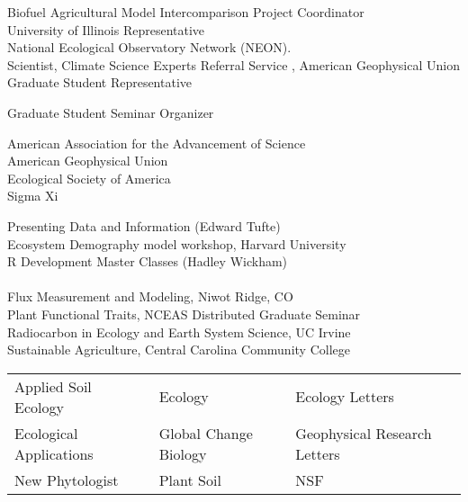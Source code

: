 \documentclass{xetexCV}
\begin{document}




 Biofuel Agricultural Model Intercomparison Project Coordinator  \\

University of Illinois Representative \\ National Ecological Observatory Network (NEON).\\

Scientist, Climate Science Experts Referral Service , American Geophysical Union \\

\mypub  Graduate Student Representative %

\mypub Graduate Student Seminar Organizer %

 American Association for the Advancement of Science\\ American Geophysical Union \\ Ecological Society of America\\ Sigma Xi



Presenting Data and Information (Edward Tufte)  \\

Ecosystem Demography model workshop, Harvard University  
\\

R Development Master Classes (Hadley Wickham)\\
\\

Flux Measurement and Modeling, Niwot Ridge, CO   
\\

Plant Functional Traits, NCEAS Distributed Graduate Seminar 
  \\

Radiocarbon in Ecology and Earth System Science, UC Irvine 
\\

Sustainable Agriculture, Central Carolina Community College 


\begin{center}
\begin{tabular}{lll}
 Applied Soil Ecology     &  Ecology                &  Ecology Letters               \\
 Ecological Applications  &  Global Change Biology  &  Geophysical Research Letters  \\
 New Phytologist          &  Plant Soil             &  NSF                           \\
\end{tabular}
\end{center}
\end{document}
